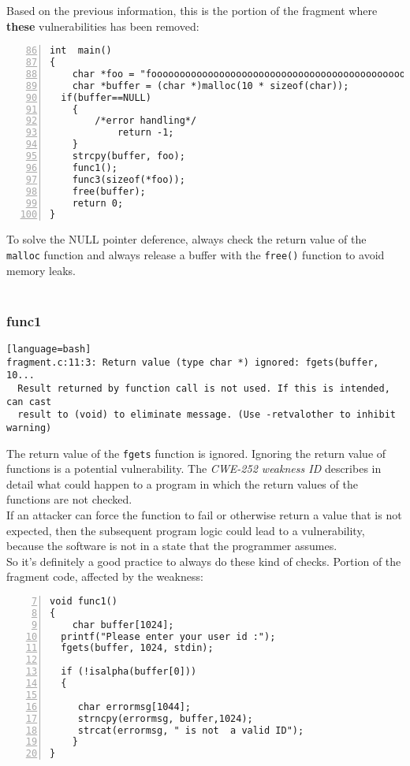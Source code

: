 \documentclass[a4paper,12pt]{article}
\begin{document}
\newpage
\noindent
Based on the previous information, this is the portion of the fragment where \textbf{these} vulnerabilities has been removed:
\begin{lstlisting}[style=c,numbers=left,firstnumber=86,linebackgroundcolor={
\ifnum\value{lstnumber}=90\color{green}\fi
\ifnum\value{lstnumber}=98\color{green}\fi}]
int  main()
{
	char *foo = "fooooooooooooooooooooooooooooooooooooooooooooooooooo";
	char *buffer = (char *)malloc(10 * sizeof(char));
  if(buffer==NULL)
	{
	    /*error handling*/
     	    return -1;
	}
	strcpy(buffer, foo);
	func1();
	func3(sizeof(*foo));
	free(buffer);
	return 0;
}

\end{lstlisting}
To solve the NULL pointer deference, always check the return value of the \texttt{malloc} function and always release a buffer with the \texttt{free()} function to avoid memory leaks.\\\\


\noindent
\subsubsection{func1}

\begin{lstlisting}[style=DOS][language=bash]
fragment.c:11:3: Return value (type char *) ignored: fgets(buffer, 10...
  Result returned by function call is not used. If this is intended, can cast
  result to (void) to eliminate message. (Use -retvalother to inhibit warning)
\end{lstlisting}
The return value of the \texttt{fgets} function is ignored.
Ignoring the return value of functions is a potential vulnerability.
The \textit{CWE-252 weakness ID} \cite{CWE252} 
describes in detail what could happen to a program in which the return values of the functions are not checked.\\
If an attacker can force the function to fail or otherwise return a value that is not expected, then the subsequent program logic could lead to a vulnerability, because the software is not in a state that the programmer assumes.\\
So it's definitely a good practice to always do these kind of checks.
\newpage
Portion of the fragment code, affected by the weakness:
\begin{lstlisting}[style=c,numbers=left,firstnumber=7,linebackgroundcolor={
\ifnum\value{lstnumber}=11\color{red}\fi
}]
void func1()
{	
	char buffer[1024];
  printf("Please enter your user id :");
  fgets(buffer, 1024, stdin);
 
  if (!isalpha(buffer[0]))
  {

     char errormsg[1044];
     strncpy(errormsg, buffer,1024);
     strcat(errormsg, " is not  a valid ID");
 	}
}
\end{lstlisting}
\end{document}
